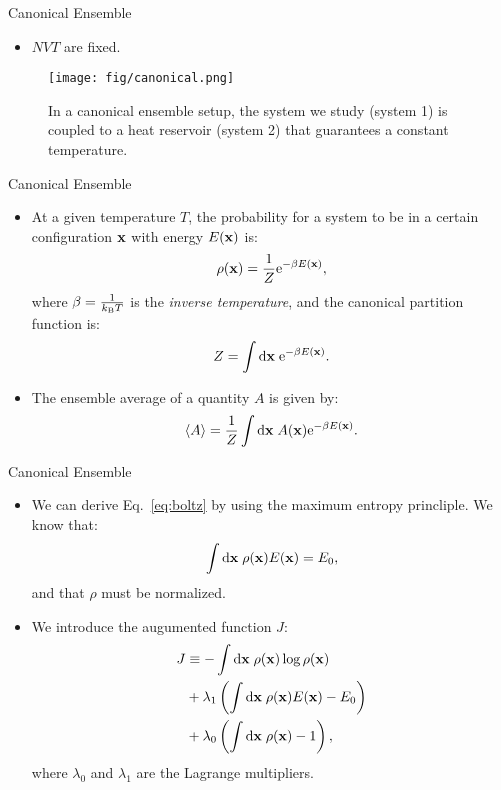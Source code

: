 \documentclass[10pt]{beamer}
\begin{document}
\begin{frame}{Canonical Ensemble}
\begin{itemize}
\setlength\itemsep{1em}
  \item $NVT$ are fixed.
\end{itemize}
\begin{figure}
\centering
  \texttt{[image: fig/canonical.png]}
  \caption{In a canonical ensemble setup, the system we study (system 1) is coupled to a heat reservoir (system 2) that guarantees a constant temperature.}
\end{figure}
\end{frame}

\begin{frame}{Canonical Ensemble}
\begin{itemize}
\setlength\itemsep{1em}
  \item At a given temperature $T$, the probability for a system to be in a certain configuration ${\bf x}$ with energy $E({\bf x})$ is:
  \begin{equation}
  \label{eq:boltz}
    \rho({\bf x}) = \frac{1}{Z} \mathrm{e}^{-\beta E({\bf x})},
  \end{equation}
  where $\beta = \frac{1}{k_\mathrm{B}T}$ is the \textit{inverse temperature}, and the canonical partition function is:
  \begin{equation}
    Z = \int\mathrm{d}{\bf x}\; \mathrm{e}^{-\beta E({\bf x})}.
  \end{equation}

  \item The ensemble average of a quantity $A$ is given by:
  \begin{equation}
    \left< A \right> = \frac{1}{Z} \int\mathrm{d}{\bf x}\; A({\bf x}) \mathrm{e}^{-\beta E({\bf x})}.
  \end{equation}
\end{itemize}
\end{frame}

\begin{frame}{Canonical Ensemble}
\begin{itemize}
\setlength\itemsep{1em}
  \item We can derive Eq.~\ref{eq:boltz} by using the maximum entropy princliple. We know that:
  \begin{equation}
    \int\mathrm{d}{\bf x}\;\rho({\bf x}) E({\bf x}) = E_0,
  \end{equation}
  and that $\rho$ must be normalized.

  \item We introduce the augumented function $J$:
  \begin{align}
    J &\equiv -\int\mathrm{d}{\bf x}\;\rho({\bf x})\log\rho({\bf x}) \\ &+ \lambda_1 \left(\int\mathrm{d}{\bf x}\;\rho({\bf x})E({\bf x}) - E_0\right) \\ &+ \lambda_0 \left(\int\mathrm{d}{\bf x}\;\rho({\bf x}) - 1\right),
  \end{align}
  where $\lambda_0$ and $\lambda_1$ are the Lagrange multipliers.
\end{itemize}
\end{frame}
\end{document}

